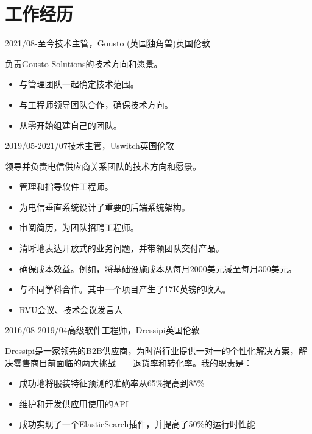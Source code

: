\documentclass[a4paper]{twentysecondcv} %
\begin{document}

\section{工作经历}

\begin{twenty} %
	\twentyitem
	    {2021/08-至今}{技术主管，Gousto (英国独角兽)}{英国伦敦}
    	{负责Gousto Solutions的技术方向和愿景。
        	\begin{itemize}
              \item 与管理团队一起确定技术范围。
              \item 与工程师领导团队合作，确保技术方向。
              \item 从零开始组建自己的团队。
            \end{itemize}}
	\twentyitem
	    {2019/05-2021/07}{技术主管，Uswitch}{英国伦敦}
    	{领导并负责电信供应商关系团队的技术方向和愿景。
        	\begin{itemize}
              \item 管理和指导软件工程师。
              \item 为电信垂直系统设计了重要的后端系统架构。
              \item 审阅简历，为团队招聘工程师。
              \item 清晰地表达开放式的业务问题，并带领团队交付产品。
              \item 确保成本效益。例如，将基础设施成本从每月2000美元减至每月300美元。
              \item 与不同学科合作。其中一个项目产生了17K英镑的收入。
              \item RVU会议、技术会议发言人
            \end{itemize}}
	\twentyitem
	    {2016/08-2019/04}{高级软件工程师，Dressipi}{英国伦敦}
    	{Dressipi是一家领先的B2B供应商，为时尚行业提供一对一的个性化解决方案，解决零售商目前面临的两大挑战——退货率和转化率。我的职责是：
        	\begin{itemize}
              \item 成功地将服装特征预测的准确率从65\%提高到85\%
              \item 维护和开发供应用使用的API
              \item 成功实现了一个ElasticSearch插件，并提高了50\%的运行时性能

\end{itemize}}
\end{twenty}
\end{document}
